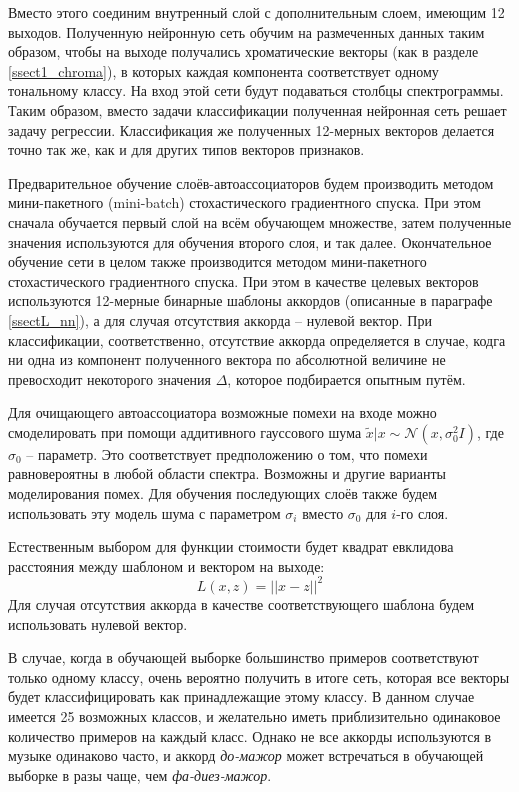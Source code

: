 Вместо этого соединим внутренный слой с дополнительным слоем, имеющим 12
выходов. Полученную нейронную сеть обучим на размеченных данных таким образом,
чтобы на выходе получались хроматические векторы (как в разделе
\ref{ssect1_chroma}), в которых каждая компонента соответствует одному
тональному классу. На вход этой сети будут подаваться столбцы спектрограммы.
Таким образом, вместо задачи классификации полученная нейронная сеть решает
задачу регрессии. Классификация же полученных 12-мерных векторов делается точно
так же, как и для других типов векторов признаков.

Предварительное обучение слоёв-автоассоциаторов будем производить методом
мини-пакетного (mini-batch) стохастического градиентного спуска. При
этом сначала обучается первый слой на всём обучающем множестве, затем
полученные значения используются для обучения второго слоя, и так далее.
Окончательное обучение сети в целом также производится методом мини-пакетного
стохастического градиентного спуска. При этом в качестве целевых векторов
используются 12-мерные бинарные шаблоны аккордов (описанные в параграфе
\ref{ssectL_nn}), а для случая отсутствия аккорда -- нулевой вектор.
При классификации, соответственно, отсутствие аккорда определяется в случае,
кодга ни одна из компонент полученного вектора по абсолютной величине не
превосходит некоторого значения $\Delta$, которое подбирается опытным путём.

Для очищающего автоассоциатора возможные помехи на входе можно смоделировать
при помощи аддитивного гауссового шума $\tilde{x}|x \sim \mathcal{N}(x,
\sigma_0^2 I)$, где $\sigma_0$ -- параметр. Это соответствует предположению о
том, что помехи равновероятны в любой области спектра. Возможны и другие
варианты моделирования помех. Для обучения последующих слоёв также будем
использовать эту модель шума с параметром $\sigma_i$ вместо $\sigma_0$ для
$i$-го слоя.

Естественным выбором для функции стоимости будет квадрат евклидова расстояния
между шаблоном и вектором на выходе:
$$L(x,z) = ||x-z||^2$$
Для случая отсутствия аккорда в качестве соответствующего шаблона будем
использовать нулевой вектор.

В случае, когда в обучающей выборке большинство примеров соответствуют только
одному классу, очень вероятно получить в итоге сеть, которая все векторы будет
классифицировать как принадлежащие этому классу. В данном случае имеется 25
возможных классов, и желательно иметь приблизительно одинаковое количество
примеров на каждый класс. Однако не все аккорды используются в музыке одинаково
часто, и аккорд \emph{до-мажор} может встречаться в обучающей выборке в разы
чаще, чем \emph{фа-диез-мажор}.


